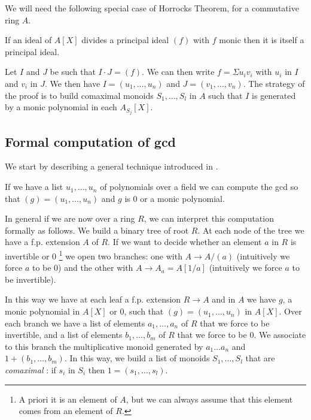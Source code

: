 We will need the following special case of Horrocks Theorem, for a commutative ring $A$.

\begin{lemma}\label{Horrocks}
  If an ideal of $A[X]$ divides a principal ideal $(f)$ with $f$ monic then it is itself a principal ideal.
\end{lemma}

Let $I$ and $J$ be such that $I\cdot J = (f)$. We can then write $f = \Sigma u_iv_i$ with $u_i$ in $I$ and
$v_i$ in $J$. We then have $I = (u_1,\dots,u_n)$ and $J=(v_1,\dots,v_n)$.
The strategy of the proof is to build comaximal monoids $S_1,\dots,S_l$ in $A$ \cite{lombardi-quitte} such
that $I$ is generated by a monic polynomial in each $A_{S_j}[X]$.

\subsection{Formal computation of gcd}

 We start by describing a general technique introduced in \cite{lombardi-quitte}.

If we have a list $u_1,\dots,u_n$ of polynomials over a field we can compute the gcd
so that $(g) = (u_1,\dots,u_n)$ and $g$ is $0$ or a monic polynomial.

In general if we are now over a ring $R$, we can interpret this computation formally as
follows. We build a binary tree of root $R$. At each node of the tree we have a f.p. extension $A$
of $R$. If we want to decide whether an element $a$ in $R$ is invertible or $0$
\footnote{A priori it is an element
of $A$, but we can always assume that this element comes from an element of $R$.}
we open two branches: one with $A\rightarrow A/(a)$ (intuitively we force $a$ to be $0$)
and the other with $A\rightarrow A_a = A[1/a]$ (intuitively we force $a$ to be invertible).

In this way we have at each leaf a f.p. extension $R\rightarrow A$ and in $A$ we have
$g$, a monic polynomial in $A[X]$ or $0$, such that $(g) = (u_1,\dots,u_n)$ in $A[X]$.
Over each branch we have a list of elements $a_1,\dots,a_n$ of $R$ that we force to be
invertible, and a list of elements $b_1,\dots,b_m$ of $R$ that we force to be $0$.
We associate to this branch the multiplicative monoid generated by $a_1\dots a_n$
and $1 + (b_1,\dots,b_m)$. In this way, we build a list of monoids $S_1,\dots,S_l$
that are {\em comaximal} \cite{lombardi-quitte}: if $s_i$ in $S_i$ then $1 = (s_1,\dots,s_l)$.


